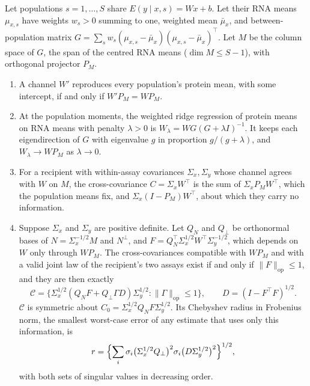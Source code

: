 \begin{proposition}\label{prop:means}
Let populations $s=1,\dots,S$ share $E(y\mid x,s)=Wx+b$. Let their RNA means
$\mu_{x,s}$ have weights $w_s>0$ summing to one, weighted mean $\bar\mu_x$, and
between-population matrix
$G=\sum_s w_s(\mu_{x,s}-\bar\mu_x)(\mu_{x,s}-\bar\mu_x)^\top$. Let $M$ be the
column space of $G$, the span of the centred RNA means ($\dim M\le S-1$), with
orthogonal projector $P_M$.
\begin{enumerate}
\item A channel $W'$ reproduces every population's protein mean, with some
intercept, if and only if $W'P_M=WP_M$.
\item At the population moments, the weighted ridge regression of protein
means on RNA means with penalty $\lambda>0$ is
$W_\lambda=WG(G+\lambda I)^{-1}$. It keeps each eigendirection of $G$ with
eigenvalue $g$ in proportion $g/(g+\lambda)$, and $W_\lambda\to WP_M$ as
$\lambda\to0$.
\item For a recipient with within-assay covariances $\Sigma_x,\Sigma_y$ whose
channel agrees with $W$ on $M$, the cross-covariance $C=\Sigma_xW^\top$ is the
sum of $\Sigma_xP_MW^\top$, which the population means fix, and
$\Sigma_x(I-P_M)W^\top$, about which they carry no information.
\item Suppose $\Sigma_x$ and $\Sigma_y$ are positive definite. Let $Q_N$ and $Q_\perp$ be orthonormal bases of $N=\Sigma_x^{-1/2}M$ and
$N^\perp$, and $F=Q_N^\top\Sigma_x^{1/2}W^\top\Sigma_y^{-1/2}$, which depends
on $W$ only through $WP_M$. The cross-covariances compatible with $WP_M$ and
with a valid joint law of the recipient's two assays exist if and only if
$\|F\|_{\mathrm{op}}\le1$, and they are then exactly
\[
 \mathcal C=\bigl\{\Sigma_x^{1/2}(Q_NF+Q_\perp\Gamma D)\Sigma_y^{1/2}:
 \|\Gamma\|_{\mathrm{op}}\le1\bigr\},\qquad D=(I-F^\top F)^{1/2}.
\]
$\mathcal C$ is symmetric about $C_0=\Sigma_x^{1/2}Q_NF\Sigma_y^{1/2}$. Its
Chebyshev radius in Frobenius norm, the smallest worst-case error of any
estimate that uses only this information, is
\[
 r=\Bigl\{\sum_i\sigma_i\bigl(\Sigma_x^{1/2}Q_\perp\bigr)^2
 \sigma_i\bigl(D\Sigma_y^{1/2}\bigr)^2\Bigr\}^{1/2},
\]
with both sets of singular values in decreasing order.
\end{enumerate}
\end{proposition}


